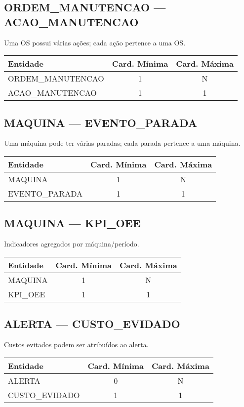 \documentclass[10pt,a4paper]{article}
\begin{document}
\subsection*{ORDEM\_MANUTENCAO — ACAO\_MANUTENCAO}
Uma OS possui várias ações; cada ação pertence a uma OS.
\begin{center}
\begin{tabular}{|l|c|c|}
\hline
\rowcolor{vermelhoheader}\color{white}\textbf{Entidade} & \textbf{Card. Mínima} & \textbf{Card. Máxima} \\
\hline
ORDEM\_MANUTENCAO & 1 & N \\
ACAO\_MANUTENCAO & 1 & 1 \\
\hline
\end{tabular}
\end{center}
\hfill
\subsection*{MAQUINA — EVENTO\_PARADA}
Uma máquina pode ter várias paradas; cada parada pertence a uma máquina.
\begin{center}
\begin{tabular}{|l|c|c|}
\hline
\rowcolor{vermelhoheader}\color{white}\textbf{Entidade} & \textbf{Card. Mínima} & \textbf{Card. Máxima} \\
\hline
MAQUINA & 1 & N \\
EVENTO\_PARADA & 1 & 1 \\
\hline
\end{tabular}
\end{center}
\vspace{0.5cm}

\subsection*{MAQUINA — KPI\_OEE}
Indicadores agregados por máquina/período.
\begin{center}
\begin{tabular}{|l|c|c|}
\hline
\rowcolor{vermelhoheader}\color{white}\textbf{Entidade} & \textbf{Card. Mínima} & \textbf{Card. Máxima} \\
\hline
MAQUINA & 1 & N \\
KPI\_OEE & 1 & 1 \\
\hline
\end{tabular}
\end{center}
\hfill
\subsection*{ALERTA — CUSTO\_EVIDADO}
Custos evitados podem ser atribuídos ao alerta.
\begin{center}
\begin{tabular}{|l|c|c|}
\hline
\rowcolor{vermelhoheader}\color{white}\textbf{Entidade} & \textbf{Card. Mínima} & \textbf{Card. Máxima} \\
\hline
ALERTA & 0 & N \\
CUSTO\_EVIDADO & 1 & 1 \\
\hline
\end{tabular}
\end{center}
\vspace{0.5cm}
\end{document}
